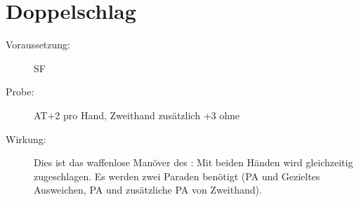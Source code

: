 \section{Doppelschlag}
\label{uAT.doppelschlag}
\begin{description}
    \item[Voraussetzung:]
        SF 
    \item[Probe:]
        AT+2 pro Hand, Zweithand zusätzlich +3 ohne 
    \item[Wirkung:]
        Dies ist das waffenlose Manöver des :
        Mit beiden Händen wird gleichzeitig zugeschlagen.
        Es werden zwei Paraden benötigt (PA und Gezieltes Ausweichen, PA und zusätzliche PA von Zweithand).
\end{description}
